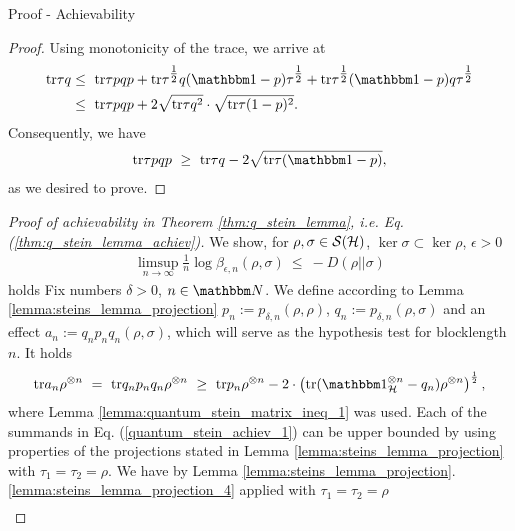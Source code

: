 \begin{subsection}{Proof - Achievability}
\begin{proof}
   Using monotonicity of the trace, we arrive at
   \begin{align*}
    \tr \tau q  
    & \leq \ \tr \tau pqp + \tr \tau^{\tfrac{1}{2}} q (\bbmeins - p) \tau^{\tfrac{1}{2}} + \tr \tau^{\tfrac{1}{2}} (\bbmeins - p)q \tau^{\tfrac{1}{2}} \\
    & \leq \ \tr \tau pqp + 2 \sqrt{\tr \tau q^2} \cdot \sqrt{\tr \tau (1-p)^2 }.\\
   \end{align*}
   Consequently, we have
   \begin{align*}
    \tr \tau pqp \ \geq \ \tr \tau q - 2 \sqrt{\tr \tau (\bbmeins - p)}, 
   \end{align*}
  as we desired to prove.
  \end{proof}
  
  \begin{proof}[Proof of achievability in Theorem \ref{thm:q_stein_lemma}, i.e. Eq. (\ref{thm:q_stein_lemma_achiev})]
  We show, for $\rho, \sigma \in {\mathcal S}({\mathcal H})$, $\ker \sigma \subset \ker \rho$, $\epsilon > 0$ 
  \begin{align*}
   \underset{n \rightarrow \infty}{\limsup} \frac{1}{n} \log \beta_{\epsilon, n}(\rho, \sigma) \ \leq \ - D(\rho||\sigma) 
  \end{align*}
  holds Fix numbers $\delta > 0$, $n \in \bbmN$. We define according to Lemma \ref{lemma:steins_lemma_projection} 
  $p_{n} := p_{\delta,n}(\rho, \rho)$,
  $q_n := p_{\delta,n}(\rho, \sigma)$ and an effect
   $a_n := q_np_nq_n(\rho, \sigma)$,
  which will serve as the hypothesis test for blocklength $n$. It holds
  \begin{align} 
   \tr a_n \rho^{\otimes n} \ = \ \tr q_np_nq_n\rho^{\otimes n} 
   \ \geq \ \tr p_n \rho^{\otimes n} - 2 \cdot \left(\tr (\bbmeins_{\cH}^{\otimes n} - q_n)\rho^{\otimes n}\right)^\frac{1}{2},  \label{quantum_stein_achiev_1}
  \end{align}
  where Lemma \ref{lemma:quantum_stein_matrix_ineq_1} was used. Each of the summands in Eq. (\ref{quantum_stein_achiev_1}) can be upper bounded by using properties of the projections stated in Lemma 
  \ref{lemma:steins_lemma_projection} with $\tau_1 = \tau_2 = \rho$. We have by Lemma \ref{lemma:steins_lemma_projection}.\ref{lemma:steins_lemma_projection_4} applied with $\tau_1 = \tau_2 = \rho$	
  \begin{align}

\end{align}
\end{proof}
\end{subsection}
